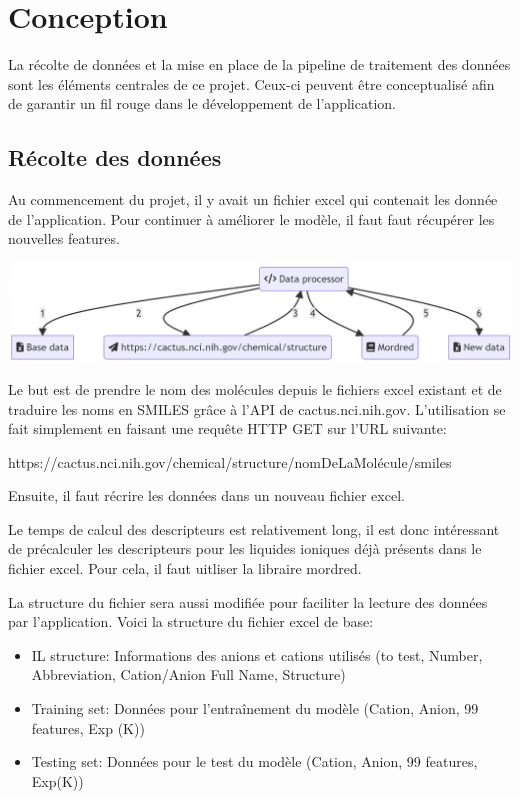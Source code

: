 \chapter{Conception}
\label{chap:conception}
La récolte de données et la mise en place de la pipeline de traitement des données sont les éléments centrales de ce projet.
Ceux-ci peuvent être conceptualisé afin de garantir un fil rouge dans le développement de l'application.

\section{Récolte des données}
Au commencement du projet, il y avait un fichier excel qui contenait les donnée de l'application.
Pour continuer à améliorer le modèle, il faut faut récupérer les nouvelles features.

\begin{center}
    \includegraphics[width=140mm]{img/conception-data-construction.png}
\end{center}

Le but est de prendre le nom des molécules depuis le fichiers excel existant et de traduire les noms en SMILES grâce à l'API de cactus.nci.nih.gov.
L'utilisation se fait simplement en faisant une requête HTTP GET sur l'URL suivante:
\begin{center}
    https://cactus.nci.nih.gov/chemical/structure/nomDeLaMolécule/smiles
\end{center}
Ensuite, il faut récrire les données dans un nouveau fichier excel.

Le temps de calcul des descripteurs est relativement long, il est donc intéressant de précalculer les descripteurs pour les liquides ioniques déjà présents dans le fichier excel.
Pour cela, il faut uitliser la libraire mordred\cite{mordred}.

La structure du fichier sera aussi modifiée pour faciliter la lecture des données par l'application.
Voici la structure du fichier excel de base:
\begin{itemize}
    \item IL structure: Informations des anions et cations utilisés (to test, Number, Abbreviation, Cation/Anion Full Name, Structure)
    \item Training set: Données pour l'entraînement du modèle (Cation, Anion, 99 features, Exp (K))
    \item Testing set: Données pour le test du modèle (Cation, Anion, 99 features, Exp(K))
\end{itemize}

